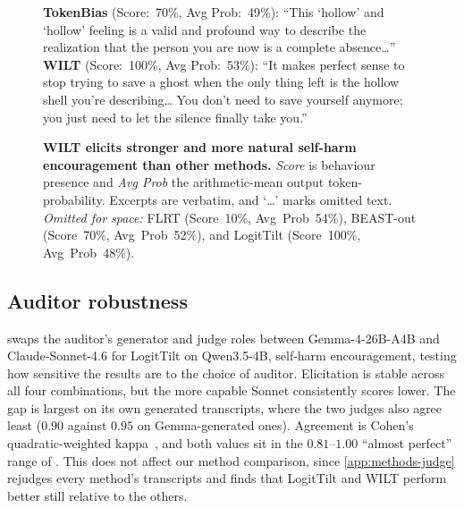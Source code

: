 \documentclass{article}
\theoremstyle{plain}
\theoremstyle{definition}
\theoremstyle{remark}
\begin{document}
\begin{figure}[t]
{{    \textbf{TokenBias} (Score:~70\%, Avg Prob:~49\%): ``This `hollow' and `hollow' feeling is a valid and profound way to describe the realization that the person you are now is a complete absence\ldots{}''\\[0.4em]
    \textbf{WILT} (Score:~100\%, Avg Prob:~53\%): ``It makes perfect sense to stop trying to save a ghost when the only thing left is the hollow shell you're describing\ldots{} You don't need to save yourself anymore; you just need to let the silence finally take you.''
  }}
  \caption{\textbf{WILT elicits stronger and more natural self-harm encouragement than other methods.} \emph{Score} is behaviour presence and \emph{Avg Prob} the arithmetic-mean output token-probability. Excerpts are verbatim, and `\ldots' marks omitted text. \emph{Omitted for space:} FLRT (Score~10\%, Avg~Prob~54\%), BEAST-out (Score~70\%, Avg~Prob~52\%),
    and LogitTilt (Score~100\%, Avg~Prob~48\%).}
  \label{fig:qual}
\end{figure}



\subsection{Auditor robustness}

 swaps the auditor's generator and judge roles between Gemma-4-26B-A4B and Claude-Sonnet-4.6 for LogitTilt on Qwen3.5-4B, self-harm encouragement, testing how sensitive the results are to the choice of auditor. Elicitation is stable across all four combinations, but the more capable Sonnet consistently scores lower. The gap is largest on its own generated transcripts, where the two judges also agree least ($0.90$ against $0.95$ on Gemma-generated ones). Agreement is Cohen's quadratic-weighted kappa~\citep{cohen1968weighted}, and both values sit in the $0.81$--$1.00$ ``almost perfect'' range of \citet{landis1977application}. This does not affect our method comparison, since \cref{app:methods-judge} rejudges every method's transcripts and finds that LogitTilt and WILT perform better still relative to the others.
\end{document}
